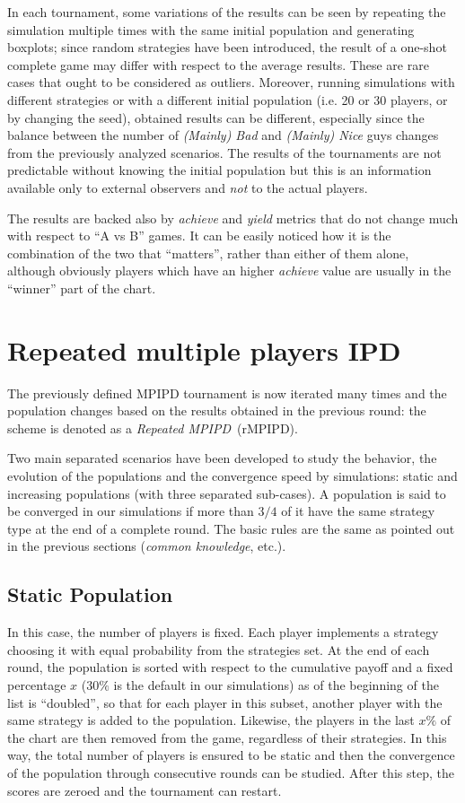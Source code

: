 \documentclass[journal,10pt,twoside]{IEEEtran}
\begin{document}
In each tournament, some variations of the results can be seen by repeating the simulation multiple times with the same initial population and generating boxplots; since random strategies have been introduced, the result of a one-shot complete game may differ with respect to the average results. These are rare cases that ought to be considered as outliers. Moreover, running simulations with different strategies or with a different initial population (i.e. 20 or 30 players, or by changing the seed), obtained results can be different, especially since the balance between the number of \textit{(Mainly) Bad} and \textit{(Mainly) Nice} guys changes from the previously analyzed scenarios. The results of the tournaments are not predictable without knowing the initial population but this is an information available only to external observers and \textit{not} to the actual players. 

The results are backed also by \textit{achieve} and \textit{yield} metrics that do not change much with respect to ``A vs B'' games.
It can be easily noticed how it is the combination of the two that ``matters'', rather than either of them alone, although obviously players which have an higher \textit{achieve} value are usually in the ``winner'' part of the chart.

\section{Repeated multiple players IPD} \label{s:rIPDMP}
The previously defined MPIPD tournament is now iterated many times and the population changes based on the results obtained in the previous round: the scheme is denoted as a \textit{Repeated MPIPD}~(rMPIPD).

Two main separated scenarios have been developed to study the behavior, the evolution of the populations and the convergence speed by simulations: static and increasing populations (with three separated sub-cases). A population is said to be converged in our simulations if more than $3/4$ of it have the same strategy type at the end of a complete round. The basic rules are the same as pointed out in the previous sections (\textit{common knowledge},  etc.).

\subsection{Static Population} \label{ss:rIPDMPc}
In this case, the number of players is fixed. Each player implements a strategy choosing it with equal probability from the strategies set. At the end of each round, the population is sorted with respect to the cumulative payoff and a fixed percentage $x$ ($30\%$ is the default in our simulations) as of the beginning of the list is ``doubled'', so that for each player in this subset, another player with the same strategy is added to the population. Likewise, the players in the last $x\%$ of the chart are then removed from the game, regardless of their strategies. In this way, the total number of players is ensured to be static and then the convergence of the population through consecutive rounds can be studied. After this step, the scores are zeroed and the tournament can restart.
\end{document}
